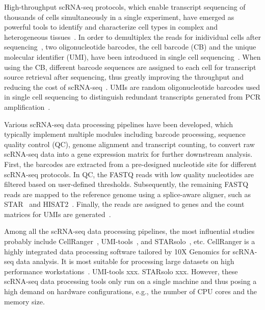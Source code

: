 \documentclass[conference]{IEEEtran}
\begin{document}
High-throughput scRNA-seq protocols, which enable transcript sequencing of thousands of cells simultaneously in a single experiment, have emerged as powerful tools to identify and characterize cell types in complex and heterogeneous tissues~\cite{Zhang2019ComparativeAO}.
In order to demultiplex the reads for inidividual cells after sequencing~\cite{Tian2018scPipe}, two oligonucleotide barcodes, the cell barcode (CB) and the unique molecular identifier (UMI), have been introduced in single cell sequencing~\cite{Rosenberg2018SinglecellPO,Cao2017ComprehensiveSC}. 
When using the CB, different barcode sequences are assigned to each cell for transcript source retrieval after sequencing, thus greatly improving the throughput and reducing the cost of scRNA-seq~\cite{Macosko2015HighlyPG,Klein2015DropletBF}. 
UMIs are random oligonucleotide barcodes used in single cell sequencing to distinguish redundant transcripts generated from PCR amplification~\cite{Kivioja2012Counting,Camara2017Methods,Smith2017UMItools}. 

Various scRNA-seq data processing pipelines have been developed, which typically implement multiple modules including barcode processing, sequence quality control (QC), genome alignment and transcript counting, to convert raw scRNA-seq data into a gene expression matrix for further downstream analysis. 
First, the barcodes are extracted from a pre-designed nucleotide site for different scRNA-seq protocols. 
In QC, the FASTQ reads with low quality nucleotides are filtered based on user-defined thresholds. 
Subsequently, the remaining FASTQ reads are mapped to the reference genome using a splice-aware aligner, such as STAR~\cite{Dobin2013STAR} and HISAT2~\cite{Kim2015HISAT}. 
Finally, the reads are assigned to genes and the count matrices for UMIs are generated~\cite{Parekh2018zUMIs}. 

Among all the scRNA-seq data processing pipelines, the most influential studies probably include CellRanger~\cite{Zheng2017Massively}, UMI-tools~\cite{Smith2017UMItools}, and STARsolo~\cite{Blibaum2019STARsolo}, etc. 
CellRanger is a highly integrated data processing software tailored by 10X Genomics for scRNA-seq data analysis. It is most suitable for processing large datasets on high performance workstations~\cite{Gao2020Comparison}. 
UMI-tools xxx.
STARsolo xxx. 
However, these scRNA-seq data processing tools only run on a single machine and thus posing a high demand on hardware configurations, e.g., the number of CPU cores and the memory size. 
\end{document}
